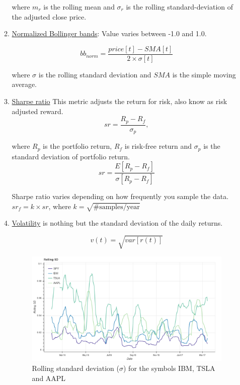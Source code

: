 \documentclass[12pt]{article}
\begin{document}
\begin{itemize}
\begin{enumerate}
where $m_r$ is the rolling mean and $\sigma_r$ is the rolling standard-deviation of the adjusted close price.

\item \underline{Normalized Bollinger bands}: Value varies between -1.0 and 1.0.

\begin{equation}
 \label{eq:bb_norm}
 bb_{norm}=\frac{price[t]-SMA[t]}{2\times\sigma[t]}
 \end{equation}

where $\sigma$ is the rolling standard deviation and $SMA$ is the simple moving average. 

\item \underline{Sharpe ratio} This metric adjusts the return for risk, also know as risk adjusted reward.
\begin{equation}
 \label{eq:sr}
	sr= \frac{R_p-R_f}{\sigma_p},
\end{equation}

where $R_p$ is the portfolio return, $R_f$ is risk-free return and $\sigma_p$ is the standard deviation of portfolio return. 
\begin{equation}
 \label{eq:sr}
 sr=\frac{E[R_p-R_f]}{\sigma[R_p-R_f]}
 \end{equation}
 
Sharpe ratio varies depending on how frequently you sample the data. $sr_f=k\times sr$, where $k=\sqrt{\mbox{\# samples/year}}$

\item \underline{Volatility} is nothing but the standard deviation of the daily returns.

\begin{equation}
 \label{eq:vol}
 v(t)=\sqrt{var[r(t)]}
 \end{equation}

\begin{figure}[!htbp]

\begin{center}
\includegraphics[height=0.4\textheight,width=\textwidth]{rolling_sd.png}
\caption{Rolling standard deviation ($\sigma$) for the symbols IBM, TSLA and AAPL}
\label{fig:std}
\end{center}
\end{figure}


\end{enumerate}
\end{itemize}
\end{document}

